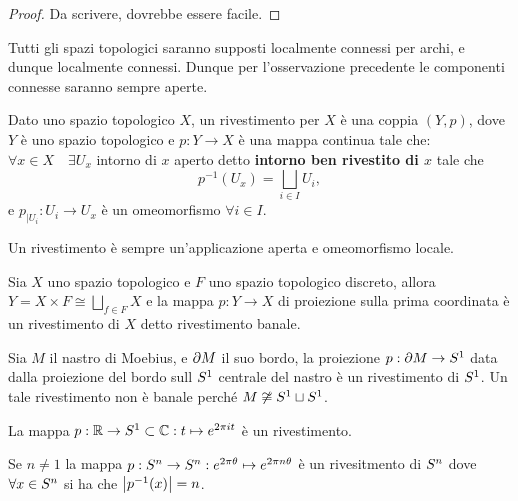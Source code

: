 \documentclass[]{article}
\begin{document}
\begin{proof}
    Da scrivere, dovrebbe essere facile. \nl
\end{proof}

Tutti gli spazi topologici saranno supposti localmente connessi per archi, e dunque localmente connessi. \nl
Dunque per l'osservazione precedente le componenti connesse saranno sempre aperte.

\begin{definition} [Rivestimento] \nl
    Dato uno spazio topologico $X$, un rivestimento per $X$ \`e una coppia $\left(Y, p\right)$, dove
    $Y$ \`e uno spazio topologico e $p: Y \to X$ \`e una mappa continua tale che: \nl
    $\forall x \in X \quad \exists U_x$ intorno di $x$ aperto detto \textbf{intorno ben rivestito di $x$} tale che 
    \[p^{-1}(U_x) = \bigsqcup_{i \in I} U_i,\]
    e $p_{\big| U_i}: U_i \to U_x$ \`e un omeomorfismo $\forall i \in I$. \nl
\end{definition}

\begin{remark}
    Un rivestimento \`e sempre un'applicazione aperta e omeomorfismo locale.
\end{remark}

\begin{example}  \nl
    Sia $X$ uno spazio topologico e $F$ uno spazio topologico discreto, allora $Y = X \times F \cong \bigsqcup_{f \in F} X$ e la mappa $p: Y \to X$ di proiezione sulla prima coordinata
    \`e un rivestimento di $X$ detto rivestimento banale.
\end{example}

\begin{example}  \nl
    Sia $M$ il nastro di Moebius, e $\partial M$ il suo bordo, la proiezione $p: \partial M \to S^{1}$ data dalla proiezione
    del bordo sull $S^{1}$ centrale del nastro \`e un rivestimento di $S^{1}$. \nl
    Un tale rivestimento non \`e banale perch\'e $M \not\cong S^{1} \sqcup S^{1}$.
\end{example}

\begin{example}  \nl
    La mappa $p: \mathbb{R} \to S^{1} \subset \mathbb{C}: t \mapsto e^{2 \pi i t}$ \`e un rivestimento.
\end{example}

\begin{example}  \nl
    Se $n \neq 1$ la mappa $p: S^{n} \to S^{n}: e^{2 \pi \theta} \mapsto e^{2 \pi n \theta}$ \`e un rivesitmento
    di $S^{n}$ dove $\forall x \in S^{n}$ si ha che $\left| p^{-1}(x) \right| = n$. 
\end{example}
\end{document}
